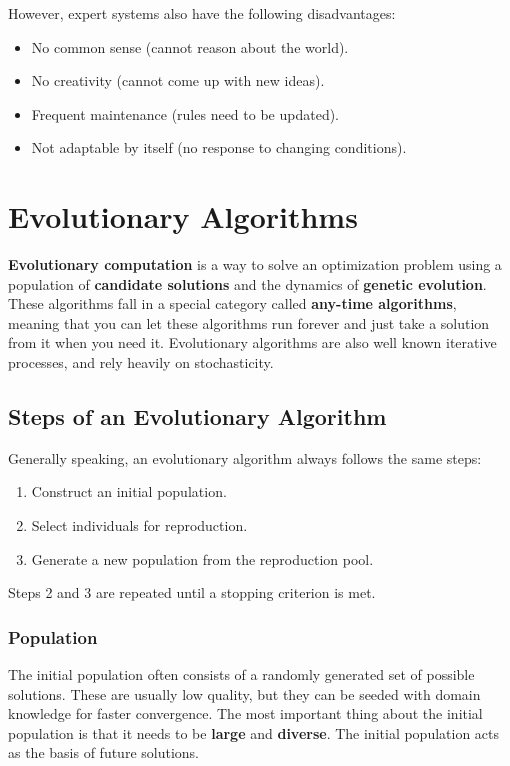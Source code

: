 \documentclass[12pt]{article}
\begin{document}
\noindent
However, expert systems also have the following disadvantages:

\begin{itemize}
    \item No common sense (cannot reason about the world).
    \item No creativity (cannot come up with new ideas).
    \item Frequent maintenance (rules need to be updated).
    \item Not adaptable by itself (no response to changing conditions).
\end{itemize}

%
%
\newpage
\section{Evolutionary Algorithms}
\textbf{Evolutionary computation} is a way to solve an optimization problem using a population of \textbf{candidate solutions} and the dynamics of \textbf{genetic evolution}.
These algorithms fall in a special category called \textbf{any-time algorithms}, meaning that you can let these algorithms run forever and just take a solution from it when you need it.
Evolutionary algorithms are also well known iterative processes, and rely heavily on stochasticity.

\subsection{Steps of an Evolutionary Algorithm}
Generally speaking, an evolutionary algorithm always follows the same steps:

\begin{enumerate}
    \item Construct an initial population.
    \item Select individuals for reproduction.
    \item Generate a new population from the reproduction pool.
\end{enumerate}

\noindent
Steps 2 and 3 are repeated until a stopping criterion is met.

\subsubsection{Population}
The initial population often consists of a randomly generated set of possible solutions.
These are usually low quality, but they can be seeded with domain knowledge for faster convergence.
The most important thing about the initial population is that it needs to be \textbf{large} and \textbf{diverse}.
The initial population acts as the basis of future solutions.
\end{document}
